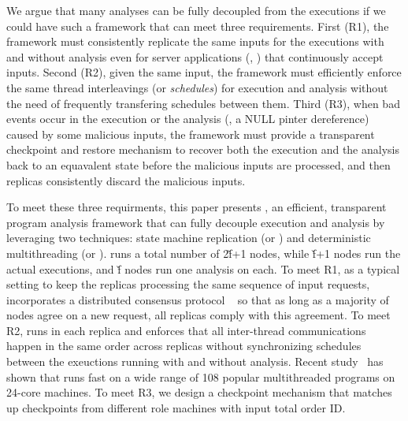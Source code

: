 

We argue that many analyses can be fully decoupled from the executions if 
we could have such a framework that can meet three requirements. First (R1), 
the framework must consistently replicate the same inputs for the executions 
with and without analysis even for server applications (\eg, \apache) that 
continuously accept inputs. Second (R2), given the same input, the framework 
must efficiently enforce the same thread interleavings (or \emph{schedules}) 
for execution and analysis without the need of frequently transfering schedules 
between them. Third (R3), when bad events occur in the execution or the 
analysis (\eg, a NULL pinter dereference) caused by some malicious inputs, the 
framework must provide a transparent checkpoint and restore mechanism to 
recover both the execution and the analysis back to an equavalent state before 
the malicious inputs are processed, and then replicas consistently discard the 
malicious inputs.


To meet these three requirments, this paper presents \xxx, an efficient, 
transparent program analysis framework that can fully decouple execution and 
analysis by leveraging two techniques: state machine replication (or \smr) and 
deterministic multithreading (or \dmt). \xxx runs a total number of 2\v{f}+1 
nodes, while \v{f}+1 nodes run the actual executions, and \v{f} nodes run one 
analysis on each. To meet R1, as a typical \smr setting to keep the replicas 
processing the same sequence of input requests, \xxx incorporates a distributed 
consensus protocol \paxos~\cite{paxos} so that as long as a majority of nodes 
agree on a new request, all replicas comply with this agreement. To meet R2, 
\dmt runs in each replica and enforces that all inter-thread communications 
happen in the same order across replicas without synchronizing schedules 
between the exeuctions running with and without analysis. Recent 
study~\cite{parrot:sosp13} has shown that \dmt runs fast on a 
wide range of 108 popular multithreaded programs on 24-core machines. To meet 
R3, we design a checkpoint mechanism that matches up checkpoints from different 
role machines with input total order ID.


